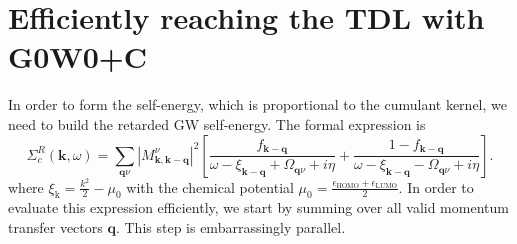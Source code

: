 \section{Efficiently reaching the TDL with G0W0+C}
In order to form the self-energy, which is proportional to the cumulant kernel, we need to build the retarded GW self-energy. The formal expression is
\begin{equation}
\Sigma_c^R(\mathbf{k}, \omega)=\sum_{\mathbf{q} \nu}\left|M_{\mathbf{k}, \mathbf{k}-\mathbf{q}}^\nu\right|^2\left[\frac{f_{\mathbf{k}-\mathbf{q}}}{\omega-\xi_{\mathbf{k}-\mathbf{q}}+\Omega_{\mathbf{q} \nu}+i \eta}+\frac{1-f_{\mathbf{k}-\mathbf{q}}}{\omega-\xi_{\mathbf{k}-\mathbf{q}}-\Omega_{\mathbf{q} \nu}+i \eta}\right] .
\end{equation}
where $\xi_{\mathrm{k}}=\frac{k^2}{2}-\mu_0$ with the chemical potential $\mu_0=\frac{\epsilon_{\mathrm{HOMO}}+\epsilon_{\mathrm{LUMO}}}{2}$.
In order to evaluate this expression efficiently, we start by summing over all valid momentum transfer vectors $\bm{q}$. This step is embarrassingly parallel.
